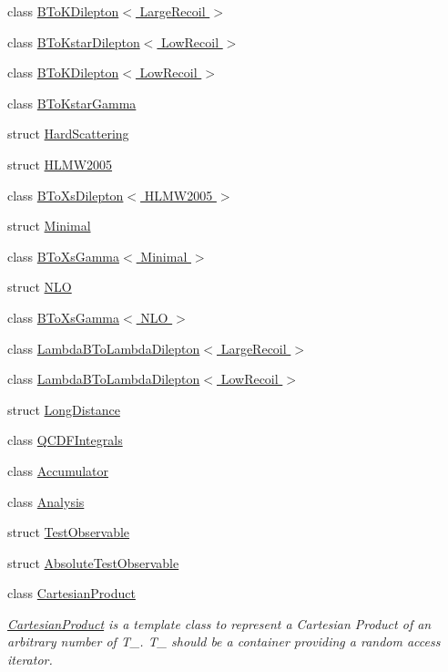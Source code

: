 \begin{DoxyCompactItemize}
\item 
class \hyperlink{classeos_1_1BToKDilepton_3_01LargeRecoil_01_4}{BToKDilepton$<$ LargeRecoil $>$}
\item 
class \hyperlink{classeos_1_1BToKstarDilepton_3_01LowRecoil_01_4}{BToKstarDilepton$<$ LowRecoil $>$}
\item 
class \hyperlink{classeos_1_1BToKDilepton_3_01LowRecoil_01_4}{BToKDilepton$<$ LowRecoil $>$}
\item 
class \hyperlink{classeos_1_1BToKstarGamma}{BToKstarGamma}
\item 
struct \hyperlink{structeos_1_1HardScattering}{HardScattering}
\item 
struct \hyperlink{structeos_1_1HLMW2005}{HLMW2005}
\item 
class \hyperlink{classeos_1_1BToXsDilepton_3_01HLMW2005_01_4}{BToXsDilepton$<$ HLMW2005 $>$}
\item 
struct \hyperlink{structeos_1_1Minimal}{Minimal}
\item 
class \hyperlink{classeos_1_1BToXsGamma_3_01Minimal_01_4}{BToXsGamma$<$ Minimal $>$}
\item 
struct \hyperlink{structeos_1_1NLO}{NLO}
\item 
class \hyperlink{classeos_1_1BToXsGamma_3_01NLO_01_4}{BToXsGamma$<$ NLO $>$}
\item 
class \hyperlink{classeos_1_1LambdaBToLambdaDilepton_3_01LargeRecoil_01_4}{LambdaBToLambdaDilepton$<$ LargeRecoil $>$}
\item 
class \hyperlink{classeos_1_1LambdaBToLambdaDilepton_3_01LowRecoil_01_4}{LambdaBToLambdaDilepton$<$ LowRecoil $>$}
\item 
struct \hyperlink{structeos_1_1LongDistance}{LongDistance}
\item 
class \hyperlink{classeos_1_1QCDFIntegrals}{QCDFIntegrals}
\item 
class \hyperlink{classeos_1_1Accumulator}{Accumulator}
\item 
class \hyperlink{classeos_1_1Analysis}{Analysis}
\item 
struct \hyperlink{structeos_1_1TestObservable}{TestObservable}
\item 
struct \hyperlink{structeos_1_1AbsoluteTestObservable}{AbsoluteTestObservable}
\item 
class \hyperlink{classeos_1_1CartesianProduct}{CartesianProduct}
\begin{DoxyCompactList}\small\item\em \hyperlink{classeos_1_1CartesianProduct}{CartesianProduct} is a template class to represent a Cartesian Product of an arbitrary number of T\_\-. T\_\- should be a container providing a random access iterator. \item\end{DoxyCompactList}\item 

\end{DoxyCompactItemize}
